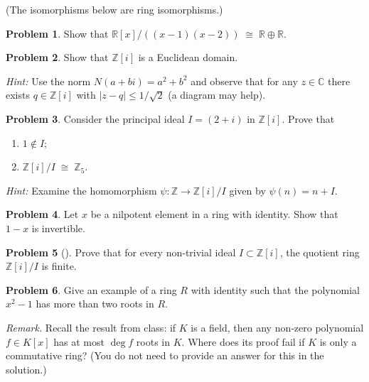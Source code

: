 \documentclass[10pt]{article}
\theoremstyle{definition} %
\newtheorem{problem}{Problem}
\theoremstyle{plain} %
\begin{document}
(The isomorphisms below are ring isomorphisms.)

\begin{problem}
    Show that $\mathbb{R}[x]\bigl/((x-1)(x-2)) \;\cong\; \mathbb{R} \oplus \mathbb{R}$.
\end{problem}

\begin{problem}
    Show that $\mathbb{Z}[i]$ is a Euclidean domain.  

    \textit{Hint:} Use the norm $N(a+bi)=a^{2}+b^{2}$ and observe that for any $z\in\mathbb{C}$ there exists
    $q\in\mathbb{Z}[i]$ with $\lvert z-q\rvert \le 1/\sqrt{2}$ (a diagram may help).
\end{problem}

\begin{problem}
    Consider the principal ideal $I=(2+i)$ in $\mathbb{Z}[i]$.  Prove that
    \begin{enumerate}[label=(\alph*)]
        \item $1\notin I$;
        \item $\mathbb{Z}[i]/I \;\cong\; \mathbb{Z}_{5}$.
    \end{enumerate}

    \textit{Hint:} Examine the homomorphism $\psi:\mathbb{Z}\to\mathbb{Z}[i]/I$ given by $\psi(n)=n+I$.
\end{problem}

\begin{problem}
    Let $x$ be a nilpotent element in a ring with identity.  Show that $1 - x$ is invertible.
\end{problem}

\begin{problem}[]
    Prove that for every non‑trivial ideal $I \subset \mathbb{Z}[i]$, the quotient ring $\mathbb{Z}[i]/I$ is finite.
\end{problem}
\begin{problem}
  Give an example of a ring $R$ with identity such that the polynomial $x^{2}-1$
  has more than two roots in $R$.
\end{problem}

\textit{Remark.} Recall the result from class: if $K$ is a field, then any non‑zero
polynomial $f \in K[x]$ has at most $\deg f$ roots in $K$.
Where does its proof fail if $K$ is only a commutative ring?
(You do not need to provide an answer for this in the solution.)
\end{document}
